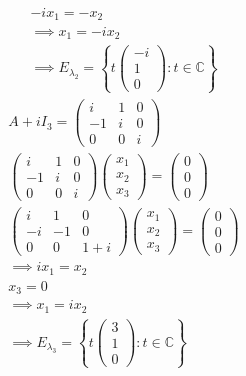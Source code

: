 \begin{enumerate}
\begin{gather}
-ix_1 = -x_2\\
\implies x_1 = -ix_2\\
\implies E_{\lambda_2} = \left\{
t\begin{pmatrix}-i\\1\\0\end{pmatrix} \colon t \in \mathbb{C}
\right\}
\end{gather}
\begin{gather}
A + i I_3 = \begin{pmatrix}
i & 1 & 0\\
-1 & i & 0\\
0 & 0 & i
\end{pmatrix}\\
\begin{pmatrix}
i & 1 & 0\\
-1 & i & 0\\
0 & 0 & i
\end{pmatrix}
\begin{pmatrix}
x_1\\x_2\\x_3
\end{pmatrix}
=
\begin{pmatrix}
0\\0\\0
\end{pmatrix}\\
\begin{pmatrix}
i & 1 & 0\\
-i & -1 & 0\\
0 & 0 & 1+i
\end{pmatrix}
\begin{pmatrix}
x_1\\x_2\\x_3
\end{pmatrix}
=
\begin{pmatrix}
0\\0\\0
\end{pmatrix}\\
\implies ix_1 = x_2\\
x_3 = 0\\
\implies x_1 = ix_2\\
\implies E_{\lambda_3} = \left\{
t \begin{pmatrix}3\\1\\0\end{pmatrix}\colon t \in \mathbb{C}
\right\}
\end{gather}

\end{enumerate}
